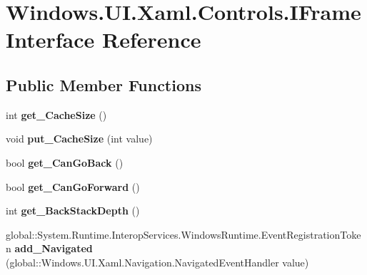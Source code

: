 \hypertarget{interface_windows_1_1_u_i_1_1_xaml_1_1_controls_1_1_i_frame}{}\section{Windows.\+U\+I.\+Xaml.\+Controls.\+I\+Frame Interface Reference}
\label{interface_windows_1_1_u_i_1_1_xaml_1_1_controls_1_1_i_frame}
\subsection*{Public Member Functions}
\begin{DoxyCompactItemize}
\item 
\mbox{\label{interface_windows_1_1_u_i_1_1_xaml_1_1_controls_1_1_i_frame_a928bc8fe265cccd51999efbf6dc79625}} 
int {\bfseries get\+\_\+\+Cache\+Size} ()
\item 
\mbox{\label{interface_windows_1_1_u_i_1_1_xaml_1_1_controls_1_1_i_frame_a090d2a89af30c25a8ade9df9f28d63a2}} 
void {\bfseries put\+\_\+\+Cache\+Size} (int value)
\item 
\mbox{\label{interface_windows_1_1_u_i_1_1_xaml_1_1_controls_1_1_i_frame_a31e423bda3f37c6c68a64e9a2c3cfc96}} 
bool {\bfseries get\+\_\+\+Can\+Go\+Back} ()
\item 
\mbox{\label{interface_windows_1_1_u_i_1_1_xaml_1_1_controls_1_1_i_frame_a346c7bc9a558e30d8c23493675ea1f25}} 
bool {\bfseries get\+\_\+\+Can\+Go\+Forward} ()
\item 
\mbox{\label{interface_windows_1_1_u_i_1_1_xaml_1_1_controls_1_1_i_frame_ac4b8a2575628ea785683c53acd9f9404}} 
int {\bfseries get\+\_\+\+Back\+Stack\+Depth} ()
\item 
\mbox{\label{interface_windows_1_1_u_i_1_1_xaml_1_1_controls_1_1_i_frame_a624be18e7822eb17b5b16a420e0721bc}} 
global\+::\+System.\+Runtime.\+Interop\+Services.\+Windows\+Runtime.\+Event\+Registration\+Token {\bfseries add\+\_\+\+Navigated} (global\+::\+Windows.\+U\+I.\+Xaml.\+Navigation.\+Navigated\+Event\+Handler value)

\end{DoxyCompactItemize}
